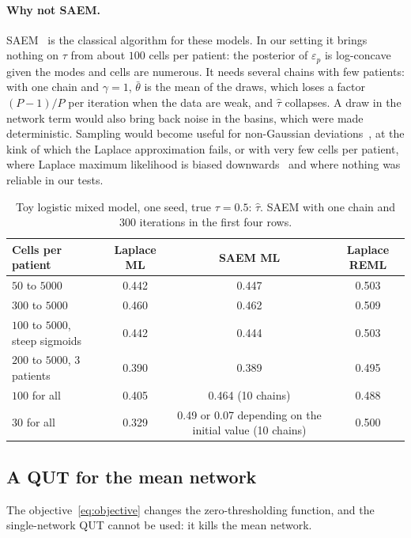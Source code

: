 \documentclass[a4paper, 11pt]{article}
\newcommand{\tb}{\bar\theta}
\theoremstyle{plain}
\theoremstyle{remark}
\begin{document}
\paragraph{Why not SAEM.} SAEM~\cite{kuhn2004coupling} is the classical algorithm for these models. In our setting it brings nothing on $\tau$ from about $100$ cells per patient: the posterior of $\varepsilon_p$ is log-concave given the modes and cells are numerous. It needs several chains with few patients: with one chain and $\gamma = 1$, $\tb$ is the mean of the draws, which loses a factor $(P-1)/P$ per iteration when the data are weak, and $\hat\tau$ collapses. A draw in the network term would also bring back noise in the basins, which were made deterministic. Sampling would become useful for non-Gaussian deviations~\cite{park2008bayesian}, at the kink of which the Laplace approximation fails, or with very few cells per patient, where Laplace maximum likelihood is biased downwards~\cite{breslow1995bias} and where nothing was reliable in our tests.

\begin{table}[h]
\centering\small
\begin{tabular}{lccc}
\toprule
Cells per patient & Laplace ML & SAEM ML & Laplace REML \\
\midrule
$50$ to $5000$ & 0.442 & 0.447 & 0.503 \\
$300$ to $5000$ & 0.460 & 0.462 & 0.509 \\
$100$ to $5000$, steep sigmoids & 0.442 & 0.444 & 0.503 \\
$200$ to $5000$, $3$ patients & 0.390 & 0.389 & 0.495 \\
$100$ for all & 0.405 & 0.464 (10 chains) & 0.488 \\
$30$ for all & 0.329 & 0.49 or 0.07 depending on the initial value (10 chains) & 0.500 \\
\bottomrule
\end{tabular}
\caption{Toy logistic mixed model, one seed, true $\tau = 0.5$: $\hat\tau$. SAEM with one chain and $300$ iterations in the first four rows.}\label{tab:saem}
\end{table}

\subsection{A QUT for the mean network}

The objective~\eqref{eq:objective} changes the zero-thresholding function, and the single-network QUT cannot be used: it kills the mean network.
\end{document}
